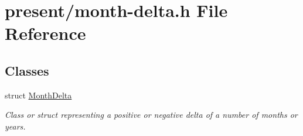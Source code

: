 \hypertarget{month-delta_8h}{\section{present/month-\/delta.h File Reference}
\label{month-delta_8h}
}
\subsection*{Classes}
\begin{DoxyCompactItemize}
\item 
struct \hyperlink{structMonthDelta}{Month\-Delta}
\begin{DoxyCompactList}\small\item\em Class or struct representing a positive or negative delta of a number of months or years. \end{DoxyCompactList}\end{DoxyCompactItemize}
